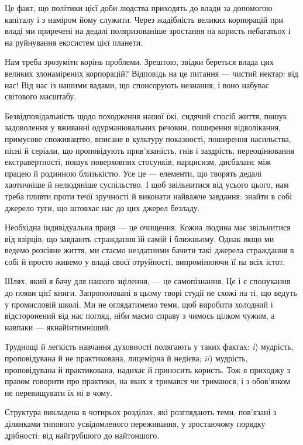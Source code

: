 \documentclass[oneside, 12pt]{book}
\begin{document}
Це факт, що політики цієї доби людства приходять до влади за допомогою капіталу і з наміром йому служити. Через жадібність великих корпорацій при владі ми приречені на дедалі поляризованіше зростання на користь небагатьох і на руйнування екосистем цієї планети.

Нам треба зрозуміти корінь проблеми. Зрештою, звідки береться влада цих великих злонамірених корпорацій? Відповідь на це питання --- чистий нектар: від нас! Від нас із нашими вадами, що спонсорують незнання, і воно набуває світового масштабу.

Безвідповідальність щодо походження нашої їжі, сидячий спосіб життя, пошук задоволення у вживанні одурманювальних речовин, поширення відволікання, примусове споживацтво, вписане в культуру показності, поширення насильства, пісні й серіали, що проповідують прив'язаність, гнів і заздрість, переоцінювання екстравертності, пошук поверховних стосунків, нарцисизм, дисбаланс між працею й родинною близькістю. Усе це --- елементи, що творять дедалі хаотичніше й нелюдяніше суспільство. І щоб звільнитися від усього цього, нам треба пливти проти течії зручності й виконати найважче завдання: знайти в собі джерело туги, що штовхає нас до цих джерел безладу.

Необхідна індивідуальна праця --- це очищення. Кожна людина має звільнитися від взірців, що завдають страждання їй самій і ближньому. Однак якщо ми ведемо розсіяне життя, ми стаємо нездатними бачити такі джерела страждання в собі й просто живемо у владі своєї отруйності, випромінюючи її на всіх істот.

Шлях, який я бачу для нашого зцілення, --- це самопізнання. Це і є спонукання до появи цієї книги. Запропоновані в цьому творі студії не схожі на ті, що ведуть у промисловій школі. Ми не оглядатимемо теми, щоб виробити холодний і відсторонений від нас погляд, ніби маємо справу з чимось цілком чужим, а навпаки --- якнайінтимніший.

Труднощі й легкість навчання духовності полягають у таких фактах: \textit{i}) мудрість, проповідувана й не практикована, лицемірна й недієва; \textit{ii}) мудрість, проповідувана й практикована, надихає й приносить користь. Тож я приходжу з правом говорити про практики, на яких я тримався чи тримаюся, і з обов'язком не перевищувати їх ні в чому.

Структура викладена в чотирьох розділах, які розглядають теми, пов'язані з ділянками типового усвідомленого переживання, у зростаючому порядку дрібності: від найгрубшого до найтоншого.
\end{document}
